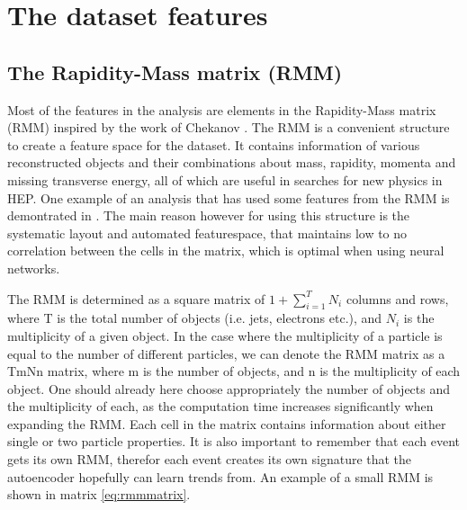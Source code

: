 \section{The dataset features}

\subsection*{The Rapidity-Mass matrix (RMM)}\label{sec:rmm}
Most of the features in the analysis are elements in the Rapidity-Mass matrix (RMM) inspired by the work of Chekanov
\cite{Chekanov_2019}. The RMM is a convenient structure to create a feature space for the dataset. It contains 
information of various reconstructed objects and their combinations about mass, rapidity, momenta and missing transverse 
energy, all of which are useful in searches for new physics in HEP\cite{Chekanov_2021}. One example of an analysis 
that has used some features from the RMM is demontrated in \cite{Santos_2017}. The main reason however for 
using this structure is the systematic layout and automated featurespace, that maintains low to no correlation between 
the cells in the matrix, which is optimal when using neural networks. \par
The RMM is determined as a square matrix of $1 + \sum_{i=1}^{T}N_i$ columns and rows, where T is the total 
number of objects (i.e. jets, electrons etc.), and $N_i$ is the multiplicity of a given object. In the case where the 
multiplicity of a particle is equal to the number of different particles, we can denote the RMM matrix as a TmNn matrix, where m 
is the number of objects, and n is the multiplicity of each object. One should already here choose appropriately 
the number of objects and the multiplicity of each, as the computation time increases significantly 
when expanding the RMM. Each cell in the matrix contains information about either single or two particle properties. 
It is also important to remember that each event gets its own RMM, therefor each event creates its own signature that 
the autoencoder hopefully can learn trends from. An example of a small RMM is shown in matrix \ref{eq:rmmmatrix}.

